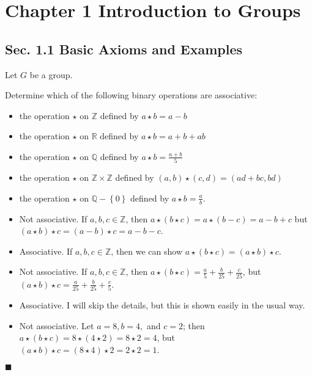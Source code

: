 \documentclass[12pt]{article}
\renewcommand{\qed}{\hfill$\blacksquare$}
\renewenvironment{proof}{\begin{addmargin}[1em]{0em}\begin{newproof}}{\end{newproof}\end{addmargin}\qed}
\newenvironment{problem}[2][Exercise]{\begin{trivlist}
\item[\hskip \labelsep {\bfseries #1}\hskip \labelsep {\bfseries #2.}]}{\end{trivlist}}
\begin{document}
\newpage
\section*{Chapter 1 Introduction to Groups}

\subsection*{Sec. 1.1 Basic Axioms and Examples}
Let $G$ be a group.

\begin{problem}{1.1.1}
Determine which of the following binary operations are associative:
\begin{itemize}
    \item the operation $\star$ on $\mathbb{Z}$ defined by $a\star b = a-b$
    \item the operation $\star$ on $\mathbb{R}$ defined by $a\star b=a+b+ab$
    \item the operation $\star$ on $\mathbb{Q}$ defined by $a\star b = \frac{a+b}{5}$
    \item the operation $\star$ on $\mathbb{Z}\times \mathbb{Z}$ defined by $\left(a,b\right)\star \left(c,d\right) = \left(ad+bc,bd\right)$
    \item the operation $\star$ on $\mathbb{Q}-\left\{0\right\}$ defined by $a\star b =\frac{a}{b}$.
\end{itemize}
\end{problem}

\begin{proof}
\begin{itemize}
    \item Not associative. If $a,b,c\in \mathbb{Z}$, then $a \star \left(b\star c\right) = a \star \left(b-c\right) = a-b+c$ but $\left(a\star b\right)\star c = \left(a-b\right)\star c = a-b-c$.
    \item Associative. If $a,b,c \in \mathbb{Z}$, then we can show $a \star \left(b\star c\right) = \left(a\star b\right)\star c$.
    \item Not associative. If $a,b,c\in \mathbb{Z}$, then $a\star \left(b\star c\right) = \frac{a}{5} + \frac{b}{25} + \frac{c}{25}$, but $\left(a\star b\right)\star c = \frac{a}{25}+\frac{b}{25}+\frac{c}{5}$.
    \item Associative. I will skip the details, but this is shown easily in the usual way.
    \item Not associative. Let $a=8,b=4,$ and $c=2$; then $a\star \left(b\star c\right) = 8 \star \left(4 \star 2\right) = 8 \star 2 = 4$, but $\left(a\star b\right)\star c = \left(8\star 4\right)\star 2 = 2\star 2 = 1$.
\end{itemize}
\end{proof}
\end{document}
